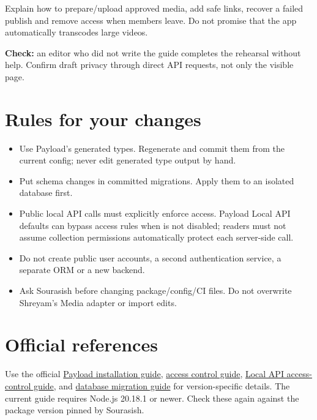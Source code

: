 \documentclass[11pt]{article}
\newcommand{\code}[1]{\path{#1}}
\begin{document}
Explain how to prepare/upload approved media, add safe links, recover a failed publish and remove access when members leave. Do not promise that the app automatically transcodes large videos.

\textbf{Check:} an editor who did not write the guide completes the rehearsal without help. Confirm draft privacy through direct API requests, not only the visible page.

\section{Rules for your changes}
\begin{itemize}
\item Use Payload's generated types. Regenerate and commit them from the current config; never edit generated type output by hand.
\item Put schema changes in committed migrations. Apply them to an isolated database first.
\item Public local API calls must explicitly enforce access. Payload Local API defaults can bypass access rules when \code{overrideAccess} is not disabled; readers must not assume collection permissions automatically protect each server-side call.
\item Do not create public user accounts, a second authentication service, a separate ORM or a new backend.
\item Ask Sourasish before changing package/config/CI files. Do not overwrite Shreyam's Media adapter or import edits.
\end{itemize}

\section{Official references}
Use the official \href{https://payloadcms.com/docs/getting-started/installation}{Payload installation guide}, \href{https://payloadcms.com/docs/access-control/overview}{access control guide}, \href{https://payloadcms.com/docs/local-api/access-control}{Local API access-control guide}, and \href{https://payloadcms.com/docs/database/migrations}{database migration guide} for version-specific details. The current guide requires Node.js 20.18.1 or newer. Check these again against the package version pinned by Sourasish.
\end{document}

